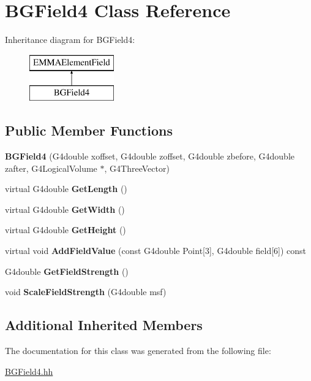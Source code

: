 \hypertarget{classBGField4}{\section{B\-G\-Field4 Class Reference}
\label{classBGField4}
}
Inheritance diagram for B\-G\-Field4\-:\begin{figure}[H]
\begin{center}
\leavevmode
\includegraphics[height=2.000000cm]{classBGField4}
\end{center}
\end{figure}
\subsection*{Public Member Functions}
\begin{DoxyCompactItemize}
\item 
\hypertarget{classBGField4_a616373e8c0c863aa7dba3eca5071a4fe}{{\bfseries B\-G\-Field4} (G4double xoffset, G4double zoffset, G4double zbefore, G4double zafter, G4\-Logical\-Volume $\ast$, G4\-Three\-Vector)}\label{classBGField4_a616373e8c0c863aa7dba3eca5071a4fe}

\item 
\hypertarget{classBGField4_a96982694a0653d70dc49c0bddc9a1a0c}{virtual G4double {\bfseries Get\-Length} ()}\label{classBGField4_a96982694a0653d70dc49c0bddc9a1a0c}

\item 
\hypertarget{classBGField4_a4fc6f543ddaf430f26df8d0d7687da02}{virtual G4double {\bfseries Get\-Width} ()}\label{classBGField4_a4fc6f543ddaf430f26df8d0d7687da02}

\item 
\hypertarget{classBGField4_aaef21e47c9eb04de54c54eaaa447ddaa}{virtual G4double {\bfseries Get\-Height} ()}\label{classBGField4_aaef21e47c9eb04de54c54eaaa447ddaa}

\item 
\hypertarget{classBGField4_a5fb7b43392be3ccf8851be3d5cef6906}{virtual void {\bfseries Add\-Field\-Value} (const G4double Point\mbox{[}3\mbox{]}, G4double field\mbox{[}6\mbox{]}) const }\label{classBGField4_a5fb7b43392be3ccf8851be3d5cef6906}

\item 
\hypertarget{classBGField4_a1a691325351535cc7130278a3478c482}{G4double {\bfseries Get\-Field\-Strength} ()}\label{classBGField4_a1a691325351535cc7130278a3478c482}

\item 
\hypertarget{classBGField4_a511d43c534dd4646f5662bf1f2e103b6}{void {\bfseries Scale\-Field\-Strength} (G4double msf)}\label{classBGField4_a511d43c534dd4646f5662bf1f2e103b6}

\end{DoxyCompactItemize}
\subsection*{Additional Inherited Members}


The documentation for this class was generated from the following file\-:\begin{DoxyCompactItemize}
\item 
\hyperlink{BGField4_8hh}{B\-G\-Field4.\-hh}\end{DoxyCompactItemize}
